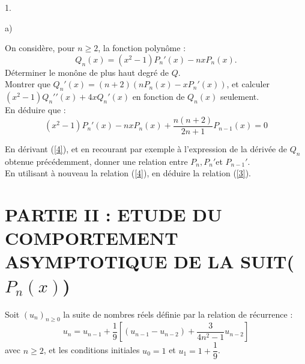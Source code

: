 \documentclass[11pt]{article}%
\begin{document}
\begin{noliste}{1.}
\begin{noliste}{a)}
 \setlength{\itemsep}{2mm}
\item On considère, pour $n\geq 2$, la fonction polynôme :
\[
Q_{n}(x) = (x^{2}-1)P_{n}{\prime }(x)-nxP_{n}(x).
\]
Déterminer le monône de plus haut degré de $Q$.\\
Montrer que $Q_{n}{\prime }(x) = (n + 2)(nP_{n}(x)-xP_{n}{\prime
}(x))$, et
calculer $(x^{2}-1)Q_{n}{\prime \prime }(x) + 4xQ_{n}{\prime }(x)$ en
fonction de $Q_{n}(x)$ seulement.\\
En déduire que :\begin{equation}
(x^{2}-1)P_{n}{\prime }(x)-nxP_{n}(x) + \dfrac{n(n + 2)}{2n +
1}P_{n-1}(x) = 0
\label{4}
\end{equation}

\item En dérivant (\ref{4}), et en recourant par exemple à l'expression
de
la dérivée de $Q_{n}$ obtenue précédemment, donner une relation entre
$P_{n},P_{n}{\prime }$et $P_{n-1}{\prime }$.\\
En utilisant à nouveau la relation (\ref{4}), en déduire la relation
(\ref{3}).
\end{noliste}
\end{noliste}

\section*{PARTIE II : ETUDE DU COMPORTEMENT ASYMPTOTIQUE DE LA
SUIT\E($P_{n}(x)$)}

Soit $(u_{n})_{n\geq 0}$ la suite de nombres réels définie par la
relation de récurrence :\begin{equation}
u_{n} = u_{n-1} + \dfrac{1}{9}[(u_{n-1}-u_{n-2}) +
\dfrac{3}{4n^{2}-1}u_{n-2}]
\label{5}
\end{equation}avec $n\geq 2$, et les conditions initiales $u_{0} = 1$
et $u_{1} = 1 + \dfrac{1}{9}$.
\end{document}
